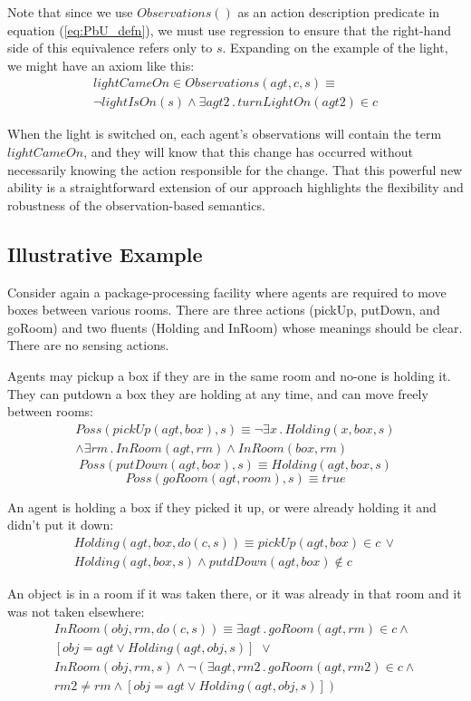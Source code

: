 \documentclass{ifaamas-submission}
\begin{document}
Note that since we use $Observations()$ as an action description
predicate in equation (\ref{eq:PbU_defn}), we must use regression
to ensure that the right-hand side of this equivalence refers only
to $s$. Expanding on the example of the light, we might have an axiom
like this:\begin{multline*}
lightCameOn\in Observations(agt,c,s)\equiv\\
\neg lightIsOn(s)\wedge\exists agt2\,.\, turnLightOn(agt2)\in c\end{multline*}


When the light is switched on, each agent's observations will contain
the term $lightCameOn$, and they will know that this change has occurred
without necessarily knowing the action responsible for the change.
That this powerful new ability is a straightforward extension of our
approach highlights the flexibility and robustness of the observation-based
semantics.


\subsection{Illustrative Example}

Consider again a package-processing facility where agents are required
to move boxes between various rooms. There are three actions (pickUp,
putDown, and goRoom) and two fluents (Holding and InRoom) whose meanings
should be clear. There are no sensing actions. 

Agents may pickup a box if they are in the same room and no-one is
holding it. They can putdown a box they are holding at any time, and
can move freely between rooms:\begin{multline*}
Poss(pickUp(agt,box),s)\equiv\neg\exists x\,.\, Holding(x,box,s)\\
\wedge\exists rm\,.\, InRoom(agt,rm)\wedge InRoom(box,rm)\end{multline*}
\[
Poss(putDown(agt,box),s)\equiv Holding(agt,box,s)\]
\[
Poss(goRoom(agt,room),s)\equiv true\]


An agent is holding a box if they picked it up, or were already holding
it and didn't put it down:\begin{multline*}
Holding(agt,box,do(c,s))\equiv pickUp(agt,box)\in c\,\vee\\
Holding(agt,box,s)\wedge putdDown(agt,box)\not\in c\end{multline*}


An object is in a room if it was taken there, or it was already in
that room and it was not taken elsewhere:\begin{multline*}
InRoom(obj,rm,do(c,s))\equiv\exists agt\,.\, goRoom(agt,rm)\in c\wedge\\
\left[obj=agt\vee Holding(agt,obj,s)\right]\,\,\vee\\
InRoom(obj,rm,s)\wedge\neg\left(\exists agt,rm2\,.\, goRoom(agt,rm2)\in c\wedge\right.\\
\left.rm2\neq rm\wedge\left[obj=agt\vee Holding(agt,obj,s)\right]\right)\end{multline*}
\end{document}
